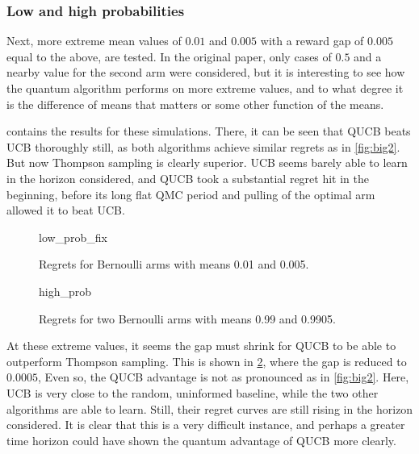 \clearpage

\subsubsection{Low and high probabilities}
Next, more extreme mean values of $0.01$ and $0.005$ with a reward gap of $0.005$ equal to the above, are tested.
In the original paper, only cases of $0.5$ and a nearby value for the second arm were considered, but it is interesting to see how the quantum algorithm performs on more extreme values, and to what degree it is the difference of means that matters or some other function of the means.

 contains the results for these simulations.
There, it can be seen that QUCB beats UCB thoroughly still, as both algorithms achieve similar regrets as in \cref{fig:big2}.
But now Thompson sampling is clearly superior.
UCB seems barely able to learn in the horizon considered, and QUCB took a substantial regret hit in the beginning, before its long flat QMC period and pulling of the optimal arm allowed it to beat UCB.


\begin{figure}[p]
    \centering
    \newcommand{\myoptions}{
        width=10cm,
        height=8cm,
        xlabel={Kiloturn},
        ylabel={Regret},
        legend entries={Baseline, UCB, QUCB, Thompson},
        legend pos=north west,
        legend cell align=left,
        mystyle,
    }
    {low_prob_fix}
    \caption{Regrets for Bernoulli arms with means 0.01 and 0.005.}
    \label{fig:low_prob_fix}
\end{figure}

\begin{figure}[p]
    \centering
    \newcommand{\myoptions}{
        width=10cm,
        height=8cm,
        xlabel={Kiloturn},
        ylabel={Regret},
        legend entries={Baseline, UCB, QUCB, Thompson},
        legend pos=north west,
        legend cell align=left,
        mystyle,
    }
    {high_prob}
    \caption{Regrets for two Bernoulli arms with means 0.99 and 0.9905.}
    \label{fig:high_prob}
\end{figure}

At these extreme values, it seems the gap must shrink for QUCB to be able to outperform Thompson sampling.
This is shown in \cref{fig:high_prob}, where the gap is reduced to $0.0005$,
Even so, the QUCB advantage is not as pronounced as in \cref{fig:big2}.
Here, UCB is very close to the random, uninformed baseline, while the two other algorithms are able to learn.
Still, their regret curves are still rising in the horizon considered.
It is clear that this is a very difficult instance, and perhaps a greater time horizon could have shown the quantum advantage of QUCB more clearly.

